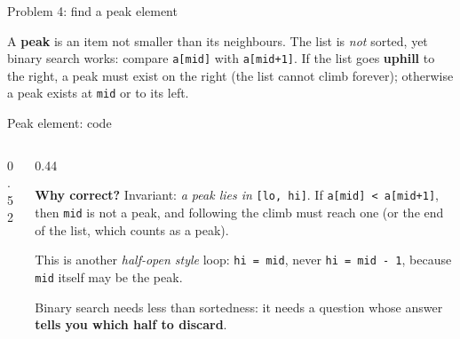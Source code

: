 \documentclass[aspectratio=169,10pt]{beamer}
\begin{document}
\begin{frame}{Problem 4: find a peak element}
\begin{sfig}[0.7]
\begin{tikzpicture}
  
\end{tikzpicture}
\end{sfig}
\vspace{1mm}
{\small A \textbf{peak} is an item not smaller than its neighbours. The list is \emph{not} sorted, yet binary search works: compare \texttt{a[mid]} with \texttt{a[mid+1]}. If the list goes \textbf{uphill} to the right, a peak must exist on the right (the list cannot climb forever); otherwise a peak exists at \texttt{mid} or to its left.}
\end{frame}

\begin{frame}{Peak element: code}
\begin{columns}[T]
\begin{column}{0.52\textwidth}
\vspace{2mm}
\end{column}
\begin{column}{0.44\textwidth}
{\small
\textbf{Why correct?} Invariant: \emph{a peak lies in} \texttt{[lo, hi]}. If \texttt{a[mid] < a[mid+1]}, then \texttt{mid} is not a peak, and following the climb must reach one (or the end of the list, which counts as a peak).

\vspace{2mm}
This is another \emph{half-open style} loop: \texttt{hi = mid}, never \texttt{hi = mid - 1}, because \texttt{mid} itself may be the peak.

\vspace{2mm}
Binary search needs less than sortedness: it needs a question whose answer \textbf{tells you which half to discard}.}
\end{column}
\end{columns}
\end{frame}
\end{document}

